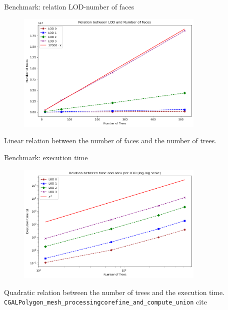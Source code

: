\documentclass[10pt]{beamer}
\begin{document}
\begin{frame}{Benchmark: relation LOD-number of faces}
  \begin{figure}[H]
    \centering
    \includegraphics[width=0.8\textwidth]{images/bench_ntree_nfaces.png}
\end{figure}
Linear relation between the number of faces and the number of trees.
\end{frame}

\begin{frame}{Benchmark: execution time}
  \begin{figure}[H]
    \centering
    \includegraphics[width=0.8\textwidth]{images/bench_time_ntree_quad.png}
\end{figure}
Quadratic relation between the number of trees and the execution time.\\
\texttt{CGAL\:\:Polygon\_mesh\_processing\:\:corefine\_and\_compute\_union}
cite
\end{frame}
\end{document}
